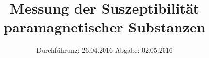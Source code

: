 

\subject{V606}
\title{Messung der Suszeptibilität paramagnetischer Substanzen}
\date{
  Durchführung: 26.04.2016
  \hspace{3em}
  Abgabe: 02.05.2016
}



\maketitle
\thispagestyle{empty}
\tableofcontents
\newpage







\printbibliography


